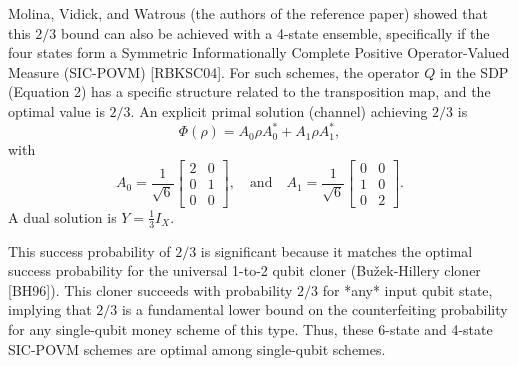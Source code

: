 \documentclass{article} %
\begin{document}
Molina, Vidick, and Watrous (the authors of the reference paper) showed that this $2/3$ bound can also be achieved with a 4-state ensemble, specifically if the four states form a Symmetric Informationally Complete Positive Operator-Valued Measure (SIC-POVM) [RBKSC04]. For such schemes, the operator $Q$ in the SDP (Equation 2) has a specific structure related to the transposition map, and the optimal value is $2/3$.
An explicit primal solution (channel) achieving $2/3$ is $$\Phi(\rho) = A_0 \rho A_0^* + A_1 \rho A_1^*,$$ with $$A_0 = \frac{1}{\sqrt{6}}\begin{bmatrix} 2 & 0 \\ 0 & 1 \\ 0 & 0 \end{bmatrix},\quad\text{and}\quad A_1 = \frac{1}{\sqrt{6}}\begin{bmatrix} 0 & 0 \\ 1 & 0 \\ 0 & 2 \end{bmatrix}.$$ A dual solution is $Y=\frac{1}{3}I_X$.

This success probability of $2/3$ is significant because it matches the optimal success probability for the universal 1-to-2 qubit cloner (Bužek-Hillery cloner [BH96]). This cloner succeeds with probability $2/3$ for *any* input qubit state, implying that $2/3$ is a fundamental lower bound on the counterfeiting probability for any single-qubit money scheme of this type. Thus, these 6-state and 4-state SIC-POVM schemes are optimal among single-qubit schemes.


\end{document}
